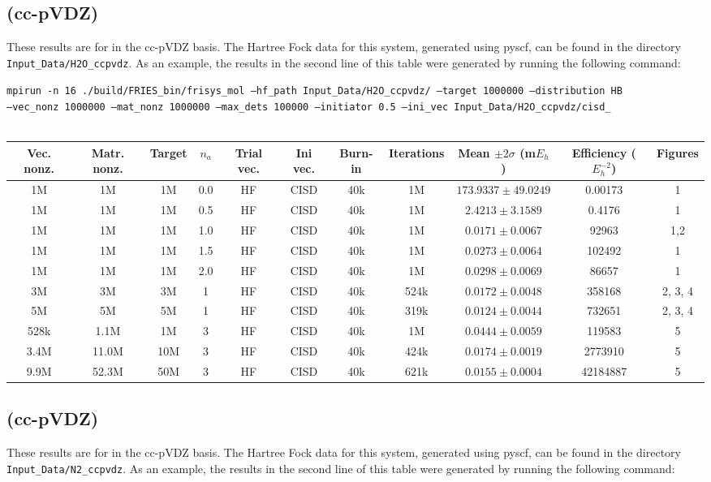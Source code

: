 \documentclass[12pt, landscape]{article}
\begin{document}
\subsection*{ (cc-pVDZ)}
These results are for  in the cc-pVDZ basis. The Hartree Fock data for this system, generated using pyscf, can be found in the directory \texttt{Input\_Data/H2O\_ccpvdz}. As an example, the results in the second line of this table were generated by running the following command:

\texttt{mpirun -n 16 ./build/FRIES\_bin/frisys\_mol --hf\_path Input\_Data/H2O\_ccpvdz/ --target 1000000 --distribution HB}\\ \texttt{--vec\_nonz 1000000 --mat\_nonz 1000000 --max\_dets 100000 --initiator 0.5 --ini\_vec Input\_Data/H2O\_ccpvdz/cisd\_}
\\~\\
\begin{tabular}{c|c|c|c|c|c|c|c|c|c|c}
Vec. nonz. & Matr. nonz. & Target & $n_a$ & Trial vec. & Ini vec. & Burn-in & Iterations & Mean $\pm 2 \sigma$ (m$E_h$) & Efficiency ($E_h^{-2}$) & Figures \\ \hline
1M & 1M & 1M & 0.0 & HF & CISD & 40k & 1M & $173.9337 \pm 49.0249$ & 0.00173 & 1 \\
1M & 1M & 1M & 0.5 & HF & CISD & 40k & 1M & $2.4213 \pm 3.1589$ & 0.4176 & 1 \\
1M & 1M & 1M & 1.0 & HF & CISD & 40k & 1M & $0.0171 \pm 0.0067$ & 92963 & 1,2 \\
1M & 1M & 1M & 1.5 & HF & CISD & 40k & 1M & $0.0273 \pm 0.0064$ & 102492 & 1 \\
1M & 1M & 1M & 2.0 & HF & CISD & 40k & 1M & $0.0298 \pm 0.0069$ & 86657 & 1 \\
3M & 3M & 3M & 1 & HF & CISD & 40k & 524k & $0.0172 \pm 0.0048$ & 358168 & 2, 3, 4\\
5M & 5M & 5M & 1 & HF & CISD & 40k & 319k & $0.0124 \pm 0.0044$ & 732651 & 2, 3, 4\\
528k & 1.1M & 1M & 3 & HF & CISD & 40k & 1M & $0.0444 \pm 0.0059$ & 119583 & 5 \\
3.4M & 11.0M & 10M & 3 & HF & CISD & 40k &424k & $0.0174 \pm 0.0019$ & 2773910 & 5 \\
9.9M & 52.3M & 50M & 3 & HF & CISD & 40k & 621k & $0.0155 \pm 0.0004$ & 42184887 & 5 \\
\end{tabular}


\subsection*{ (cc-pVDZ)}
These results are for  in the cc-pVDZ basis. The Hartree Fock data for this system, generated using pyscf, can be found in the directory \texttt{Input\_Data/N2\_ccpvdz}. As an example, the results in the second line of this table were generated by running the following command:
\end{document}
